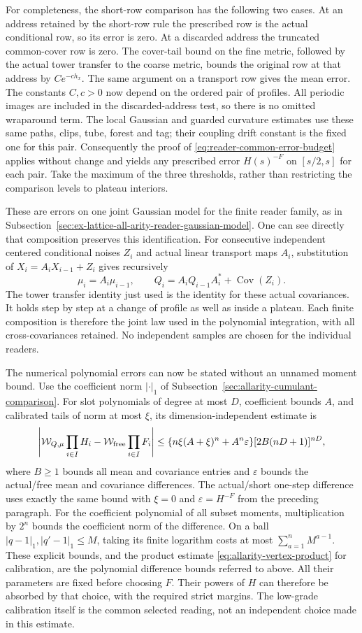 For completeness, the short-row comparison has the following two cases.
At an address retained by the short-row rule the prescribed row is the
actual conditional row, so its error is zero. At a discarded address
the truncated common-cover row is zero. The cover-tail bound on the
fine metric, followed by the actual tower transfer to the coarse
metric, bounds the original row at that address by
$Ce^{-ch_x}$. The same argument on a transport row gives the mean error.
The constants $C,c>0$ now depend on the ordered pair of profiles.
All periodic images are included in the discarded-address test, so
there is no omitted wraparound term. The local Gaussian and guarded
curvature estimates use these same paths, clips, tube, forest and tag;
their coupling drift constant is the fixed one for this pair.
Consequently the proof of
\eqref{eq:reader-common-error-budget} applies without change and yields
any prescribed error $H(s)^{-F}$ on $[s/2,s]$ for each pair. Take the
maximum of the three thresholds, rather than restricting the comparison
levels to plateau interiors.

These are errors on one joint Gaussian model for the finite reader
family, as in Subsection~\ref{sec:ex-lattice-all-arity-reader-gaussian-model}.
One can see directly that composition preserves this identification.
For consecutive independent centered conditional noises $Z_i$ and
actual linear transport maps $A_i$, substitution of
$X_i=A_iX_{i-1}+Z_i$ gives recursively
\[
 \mu_i=A_i\mu_{i-1},\qquad
 Q_i=A_iQ_{i-1}A_i^*+\operatorname{Cov}(Z_i).
\]
The tower transfer identity just used is the identity for these actual
covariances. It holds step by step at a change of profile as well as
inside a plateau. Each finite composition is therefore the joint law
used in the polynomial integration, with all cross-covariances retained.
No independent samples are chosen for the individual readers.

The numerical polynomial errors can now be stated without an unnamed
moment bound. Use the coefficient norm $|\cdot|_1$ of
Subsection~\ref{sec:allarity-cumulant-comparison}. For slot polynomials of
degree at most $D$, coefficient bounds $A$, and calibrated tails of norm
at most $\xi$, its dimension-independent estimate is
\[
 \left|\mathcal W_{Q,\mu}\prod_{i\in I}H_i
       -\mathcal W_{\rm free}\prod_{i\in I}F_i\right|
 \le \{n\xi(A+\xi)^n+A^n\varepsilon\}
           [2B(nD+1)]^{nD},
\]
where $B\ge1$ bounds all mean and covariance entries and
$\varepsilon$ bounds the actual/free mean and covariance differences.
The actual/short one-step difference uses exactly the same bound with
$\xi=0$ and $\varepsilon=H^{-F}$ from the preceding paragraph.
For the coefficient polynomial of all subset moments, multiplication
by $2^n$ bounds the coefficient norm of the difference. On a ball
$|q-1|_1,|q'-1|_1\le M$, taking its finite logarithm costs at most
$\sum_{a=1}^nM^{a-1}$. These explicit bounds, and the
product estimate \eqref{eq:allarity-vertex-product} for calibration,
are the polynomial difference bounds referred to above. All their
parameters are fixed before choosing $F$. Their powers of $H$ can
therefore be absorbed by that choice, with the required strict margins.
The low-grade calibration itself is the common selected reading, not
an independent choice made in this estimate.

